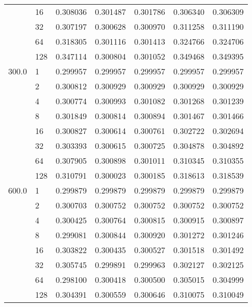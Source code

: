 \begin{tabular}{llrrrrr}
      & 16  &  0.308036 &  0.301487 &  0.301786 &  0.306340 &  0.306309 \\
      & 32  &  0.307197 &  0.300628 &  0.300970 &  0.311258 &  0.311190 \\
      & 64  &  0.318305 &  0.301116 &  0.301413 &  0.324766 &  0.324706 \\
      & 128 &  0.347114 &  0.300804 &  0.301052 &  0.349468 &  0.349395 \\
300.0 & 1   &  0.299957 &  0.299957 &  0.299957 &  0.299957 &  0.299957 \\
      & 2   &  0.300812 &  0.300929 &  0.300929 &  0.300929 &  0.300929 \\
      & 4   &  0.300774 &  0.300993 &  0.301082 &  0.301268 &  0.301239 \\
      & 8   &  0.301849 &  0.300814 &  0.300894 &  0.301467 &  0.301466 \\
      & 16  &  0.300827 &  0.300614 &  0.300761 &  0.302722 &  0.302694 \\
      & 32  &  0.303393 &  0.300615 &  0.300725 &  0.304878 &  0.304892 \\
      & 64  &  0.307905 &  0.300898 &  0.301011 &  0.310345 &  0.310355 \\
      & 128 &  0.310791 &  0.300023 &  0.300185 &  0.318613 &  0.318539 \\
600.0 & 1   &  0.299879 &  0.299879 &  0.299879 &  0.299879 &  0.299879 \\
      & 2   &  0.300703 &  0.300752 &  0.300752 &  0.300752 &  0.300752 \\
      & 4   &  0.300425 &  0.300764 &  0.300815 &  0.300915 &  0.300897 \\
      & 8   &  0.299081 &  0.300844 &  0.300920 &  0.301272 &  0.301246 \\
      & 16  &  0.303822 &  0.300435 &  0.300527 &  0.301518 &  0.301492 \\
      & 32  &  0.305745 &  0.299891 &  0.299963 &  0.302127 &  0.302125 \\
      & 64  &  0.298100 &  0.300418 &  0.300500 &  0.305015 &  0.304999 \\
      & 128 &  0.304391 &  0.300559 &  0.300646 &  0.310075 &  0.310049 \\
\bottomrule
\end{tabular}
